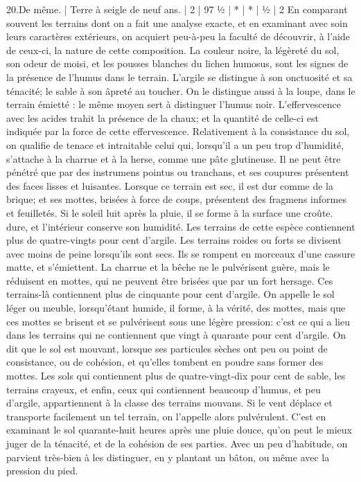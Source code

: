 20.De même. | Terre à seigle de neuf ans. | 2 | 97 ½ | * | * | ½ | 2\setcounter{page}{128} En comparant souvent les terrains dont on a fait une analyse exacte, et en examinant avec soin leurs caractères extérieurs, on acquiert peu-à-peu la faculté de découvrir, à l’aide de ceux-ci, la nature de cette composition. La couleur noire, la légèreté du sol, son odeur de moisi, et les pousses blanches du lichen humosus, sont les signes de la présence de l’humus dans le terrain. L’argile se distingue à son onctuosité et sa ténacité; le sable à son âpreté au toucher. On le distingue aussi à la loupe, dans le terrain émietté : le même moyen sert à distinguer l’humus noir. L’effervescence avec les acides trahit la présence de la chaux; et la quantité de celle-ci est indiquée par la force de cette effervescence. Relativement à la consistance du sol, on qualifie de tenace et intraitable celui qui, lorsqu’il a un peu trop d’humidité, s’attache à la charrue et à la herse, comme une pâte glutineuse. Il ne peut être pénétré que par des instrumens pointus ou tranchans, et ses coupures présentent des faces lisses et luisantes. Lorsque ce terrain est sec, il est dur comme de la brique; et ses mottes, brisées à force de coups, présentent des fragmens informes et feuilletés. Si le soleil luit après la pluie, il se forme à la surface une croûte.\setcounter{page}{129} dure, et l'intérieur conserve son humidité. Les terrains de cette espèce contiennent plus de quatre-vingts pour cent d'argile.
Les terrains roides ou forts se divisent avec moins de peine lorsqu'ils sont secs. Ils se rompent en morceaux d'une cassure matte, et s'émiettent. La charrue et la bêche ne le pulvérisent guère, mais le réduisent en mottes, qui ne peuvent être brisées que par un fort hersage. Ces terrains-là contiennent plus de cinquante pour cent d'argile.
On appelle le sol léger ou meuble, lorsqu'étant humide, il forme, à la vérité, des mottes, mais que ces mottes se brisent et se pulvérisent sous une légère pression: c'est ce qui a lieu dans les terrains qui ne contiennent que vingt à quarante pour cent d'argile.
On dit que le sol est mouvant, lorsque ses particules sèches ont peu ou point de consistance, ou de cohésion, et qu'elles tombent en poudre sans former des mottes. Les sols qui contiennent plus de quatre-vingt-dix pour cent de sable, les terrains crayeux, et enfin, ceux qui contiennent beaucoup d'humus, et peu d'argile, appartiennent à la classe des terrains mouvans. Si le vent déplace et transporte facilement un tel terrain, on l'appelle alors pulvérulent.\setcounter{page}{130} C'est en examinant le sol quarante-huit heures après une pluie douce, qu'on peut le mieux juger de la ténacité, et de la cohésion de ses parties. Avec un peu d'habitude, on parvient très-bien à les distinguer, en y plantant un bâton, ou même avec la pression du pied.
